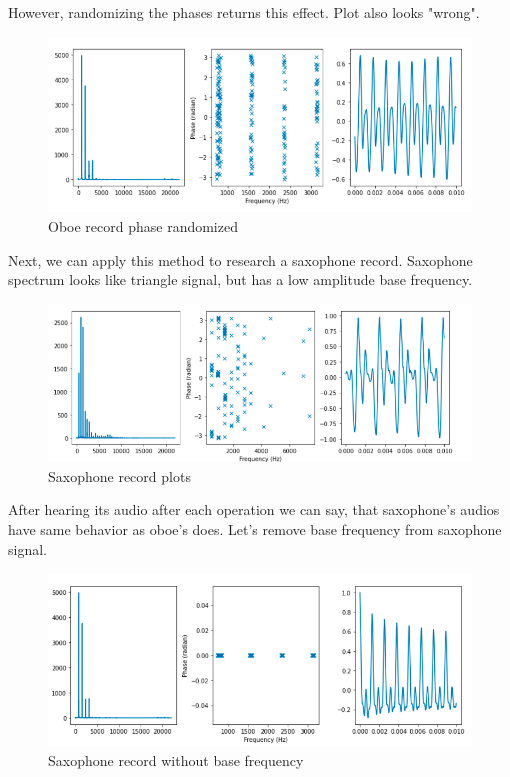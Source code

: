 \documentclass[a4paper]{article}
\begin{document}
        However, randomizing the phases returns this effect. Plot also looks "wrong".
        
        \begin{figure}[H]
            \centering
            \includegraphics[width=\textwidth]{img/ph9.png}
            \caption{Oboe record phase randomized}
            \label{fig:als_clr}
        \end{figure}
        
        Next, we can apply this method to research a saxophone record. Saxophone spectrum looks like triangle signal, but has a low amplitude base frequency.
        
        \begin{figure}[H]
            \centering
            \includegraphics[width=\textwidth]{img/ph10.png}
            \caption{Saxophone record plots}
            \label{fig:als_clr}
        \end{figure}
        
        After hearing its audio after each operation we can say, that saxophone's audios have same behavior as oboe's does.
        Let's remove base frequency from saxophone signal.
        
        \begin{figure}[H]
            \centering
            \includegraphics[width=\textwidth]{img/ph7.png}
            \caption{Saxophone record without base frequency}
            \label{fig:als_clr}
        \end{figure}
        
\end{document}
